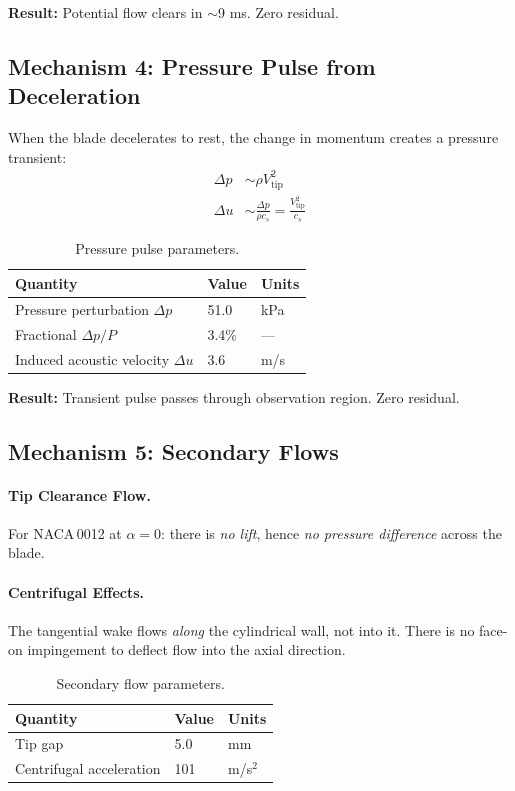\documentclass[11pt,a4paper]{article}
\begin{document}
\textbf{Result:} Potential flow clears in $\sim$9 ms. Zero residual.


\subsection{Mechanism 4: Pressure Pulse from Deceleration}

When the blade decelerates to rest, the change in momentum creates a
pressure transient:
\begin{align}
  \Delta p &\sim \rho V_\mathrm{tip}^2 \\
  \Delta u &\sim \frac{\Delta p}{\rho c_s} = \frac{V_\mathrm{tip}^2}{c_s}
\end{align}

\begin{table}[H]
\centering
\caption{Pressure pulse parameters.}
\label{tab:pressure}
\begin{tabular}{lll}
\toprule
Quantity & Value & Units \\
\midrule
Pressure perturbation $\Delta p$ & 51.0 & kPa \\
Fractional $\Delta p/P$ & 3.4\% & --- \\
Induced acoustic velocity $\Delta u$ & 3.6 & m/s \\
\bottomrule
\end{tabular}
\end{table}

\textbf{Result:} Transient pulse passes through observation region. Zero residual.


\subsection{Mechanism 5: Secondary Flows}

\paragraph{Tip Clearance Flow.}
For NACA\,0012 at $\alpha = 0$: there is \emph{no lift}, hence \emph{no
pressure difference} across the blade.

\paragraph{Centrifugal Effects.}
The tangential wake flows \emph{along} the cylindrical wall, not into it.
There is no face-on impingement to deflect flow into the axial direction.

\begin{table}[H]
\centering
\caption{Secondary flow parameters.}
\label{tab:secondary}
\begin{tabular}{lll}
\toprule
Quantity & Value & Units \\
\midrule
Tip gap & 5.0 & mm \\
Centrifugal acceleration & 101 & m/s$^2$ \\
\bottomrule
\end{tabular}
\end{table}
\end{document}
